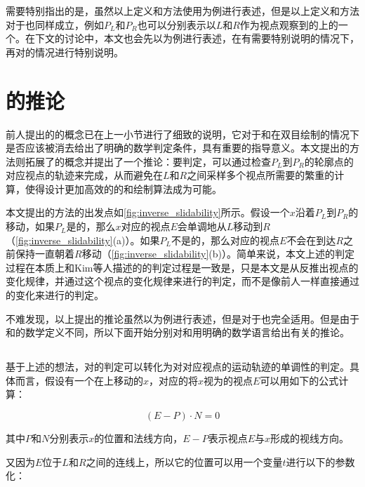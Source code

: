 需要特别指出的是，虽然以上定义和方法使用\con{}为例进行表述，但是以上定义和方法对于\scon{}也同样成立，例如$P_L$和$P_R$也可以分别表示以$L$和$R$作为视点观察到的\scon{}上的一个\sconp{}。在下文的讨论中，本文也会先以\con{}为例进行表述，在有需要特别说明的情况下，再对\scon{}的情况进行特别说明。

\section{\epsl{}的推论}

前人提出的\epsl{}的概念已在上一小节进行了细致的说明，它对于\conp{}和\sconp{}在双目绘制的情况下是否应该被消去给出了明确的数学判定条件，具有重要的指导意义。本文提出的方法则拓展了\epsl{}的概念并提出了一个推论：要判定\epsl{}，可以通过检查$P_L$到$P_R$的轮廓点的对应视点的轨迹来完成，从而避免在$L$和$R$之间采样多个视点所需要的繁重的计算，使得设计更加高效的\stc{}的\con{}和\scon{}绘制算法成为可能。

本文提出的方法的出发点如\autoref{fig:inverse_slidability}所示。假设一个\conp{}$x$沿着$P_L$到$P_R$的\ec{}移动，如果$P_L$是\epslb{}的，那么$x$对应的视点$E$会单调地从$L$移动到$R$（\autoref{fig:inverse_slidability}(a)）。如果$P_L$不是\epslb{}的，那么对应的视点$E$不会在到达$R$之前保持一直朝着$R$移动（\autoref{fig:inverse_slidability}(b)）。简单来说，本文上述的判定过程在本质上和Kim等人描述的\epsl{}的判定过程是一致是，只是本文是从\conp{}反推出视点的变化规律，并通过这个视点的变化规律来进行\epsl{}的判定，而不是像前人一样直接通过\conp{}的变化来进行\epsl{}的判定。

不难发现，以上提出的推论虽然以\con{}为例进行表述，但是对于\scon{}也完全适用。但是由于\con{}和\scon{}的数学定义不同，所以下面开始分别对\con{}和\scon{}用明确的数学语言给出有关\epsl{}的推论。

\subsection{\con{}}

基于上述的想法，对\epsl{}的判定可以转化为对对应视点的运动轨迹的单调性的判定。具体而言，假设有一个在\ec{}上移动的\conp{}$x$，对应的将$x$视为\conp{}的视点$E$可以用如下的公式计算：

\begin{equation}\label{eq:viewpoint2}
    {(E - P)}\cdot{N} = 0
\end{equation}

其中$P$和$N$分别表示\conp{}$x$的位置和法线方向，$E - P$表示视点$E$与$x$形成的视线方向。

又因为$E$位于$L$和$R$之间的连线上，所以它的位置可以用一个变量$t$进行以下的参数化：

